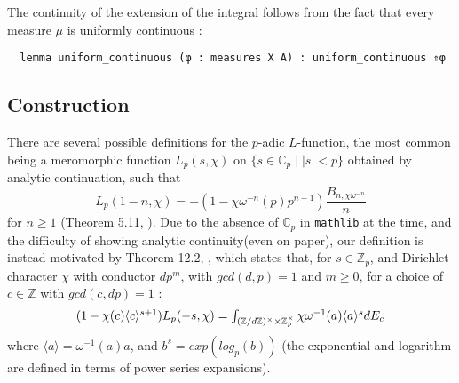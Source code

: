 \documentclass[a4paper,UKenglish,cleveref, autoref, thm-restate,pdfa]{lipics-v2021}
\newcommand{\lean}[1]{\texttt{#1}\xspace} %
\begin{document}
The continuity of the extension of the integral follows from the fact that every measure $\mu$ is uniformly continuous : 
\begin{lstlisting}
  lemma uniform_continuous (φ : measures X A) : uniform_continuous ⇑φ 
\end{lstlisting}

\subsection{Construction}
There are several possible definitions for the $p$-adic $L$-function, the most common being a meromorphic function $L_p(s, \chi)$ on
\newline $\{ s \in \mathbb{C}_p \mid |s| < p \}$ obtained by analytic continuation, such that
$$ L_p (1 - n, \chi) = -(1 - \chi \omega^{-n}(p)p^{n - 1}) \frac{B_{n, \chi \omega^{-n}}}{n} $$
for $n \ge 1$ (Theorem 5.11, \cite{cyc}). Due to the absence of $\mathbb{C}_p$ in \lean{mathlib} at the time, 
and the difficulty of showing analytic continuity(even on paper), our definition is instead motivated by Theorem 12.2, \cite{cyc}, 
which states that, for $s \in \mathbb{Z}_p$, and Dirichlet character $\chi$ with
conductor $d p^m$, with $gcd (d, p) = 1$ and $m \ge 0$, for a choice of $c \in \mathbb{Z}$
with $gcd (c, dp) = 1$ :
\begin{equation}\label{eqn:2}
  $$ (1 - \chi(c) \langle c \rangle ^{s+1}) L_p(-s, \chi) = \int_{(\mathbb{Z}/d \mathbb{Z})^{\times} \times \mathbb{Z}_p^{\times}}
\chi \omega^{-1}(a) \langle a \rangle ^s dE_c $$
\end{equation}
where $\langle a \rangle  = \omega^{-1}(a) a$, and $b^s = exp (log_p (b))$ (the exponential and logarithm are defined in 
terms of power series expansions).
\end{document}
